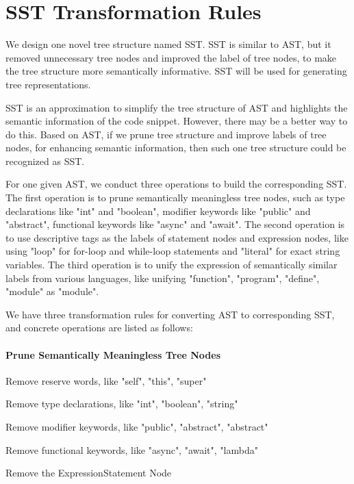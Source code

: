 \section{SST Transformation Rules}


We design one novel tree structure named SST. SST is similar to AST, but it removed unnecessary tree nodes and improved the label of tree nodes, to make the tree structure more semantically informative. SST will be used for generating tree representations.

SST is an approximation to simplify the tree structure of AST and highlights the semantic information of the code snippet. However, there may be a better way to do this. Based on AST, if we prune tree structure and improve labels of tree nodes, for enhancing semantic information, then such one tree structure could be recognized as SST.

For one given AST, we conduct three operations to build the corresponding SST. The first operation is to prune semantically meaningless tree nodes, such as type declarations like "int" and "boolean", modifier keywords like "public" and "abstract", functional keywords like "async" and "await". The second operation is to use descriptive tags as the labels of statement nodes and expression nodes, like using "loop" for for-loop and while-loop statements and "literal" for exact string variables. The third operation is to unify the expression of semantically similar labels from various languages, like unifying "function", "program", "define", "module" as "module".


We have three transformation rules for converting AST to corresponding SST, and concrete operations are listed as follows:


\paragraph{Prune Semantically Meaningless Tree Nodes}

\begin{compactenum}
\item Remove reserve words, like "self", "this", "super"
\item Remove type declarations, like "int", "boolean", "string"
\item Remove modifier keywords, like "public", "abstract", "abstract"
\item Remove functional keywords, like "async", "await", "lambda"
\item Remove the ExpressionStatement Node
\end{compactenum}

